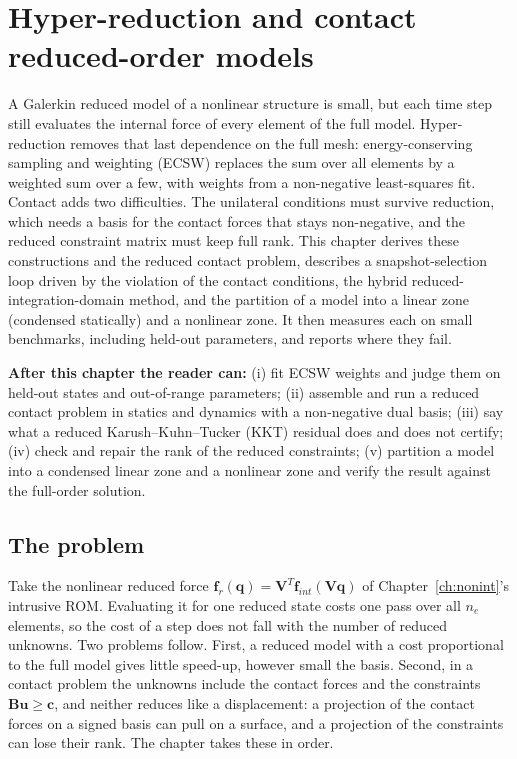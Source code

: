 \chapter{Hyper-reduction and contact reduced-order models}\label{ch:hyper}

\begin{tcolorbox}[colback=gray!5,colframe=gray!50,title={In this chapter}]
A Galerkin reduced model of a nonlinear structure is small, but each time step still evaluates the internal force of every element of the full model. Hyper-reduction removes that last dependence on the full mesh: energy-conserving sampling and weighting (ECSW) replaces the sum over all elements by a weighted sum over a few, with weights from a non-negative least-squares fit. Contact adds two difficulties. The unilateral conditions must survive reduction, which needs a basis for the contact forces that stays non-negative, and the reduced constraint matrix must keep full rank. This chapter derives these constructions and the reduced contact problem, describes a snapshot-selection loop driven by the violation of the contact conditions, the hybrid reduced-integration-domain method, and the partition of a model into a linear zone (condensed statically) and a nonlinear zone. It then measures each on small benchmarks, including held-out parameters, and reports where they fail.\par\smallskip
\textbf{After this chapter the reader can:} (i) fit ECSW weights and judge them on held-out states and out-of-range parameters; (ii) assemble and run a reduced contact problem in statics and dynamics with a non-negative dual basis; (iii) say what a reduced Karush--Kuhn--Tucker (KKT) residual does and does not certify; (iv) check and repair the rank of the reduced constraints; (v) partition a model into a condensed linear zone and a nonlinear zone and verify the result against the full-order solution.
\end{tcolorbox}

\section{The problem}\label{sec:hy-problem}

Take the nonlinear reduced force $\bm f_r(\bm q)=\bm V^T\bm f_{int}(\bm V\bm q)$ of Chapter~\ref{ch:nonint}'s intrusive ROM. Evaluating it for one reduced state costs one pass over all $n_e$ elements, so the cost of a step does not fall with the number of reduced unknowns. Two problems follow. First, a reduced model with a cost proportional to the full model gives little speed-up, however small the basis. Second, in a contact problem the unknowns include the contact forces and the constraints $\bm B\bm u\ge\bm c$, and neither reduces like a displacement: a projection of the contact forces on a signed basis can pull on a surface, and a projection of the constraints can lose their rank. The chapter takes these in order.

